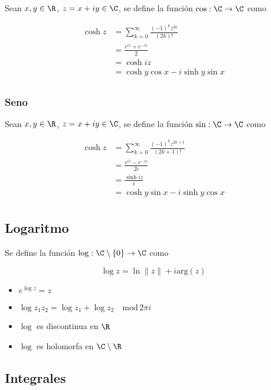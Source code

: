 Sean $x,y\in\R$, $z = x+iy\in\C$, se define la función $\cos: \C \to \C$ como

\begin{equation}
\begin{split}
    \cosh{z} &= \sum^{\infty}_{k=0}\frac{(-1)^{k}z^{2k}}{(2k)!}\\
    &= \frac{e^{iz}+e^{-iz}}{2}\\
    &= \cosh{iz}\\
    &= \cosh{y}\cos{x}-i\sinh{y}\sin{x}\\
\end{split}
\nonumber
\end{equation}

\subsubsection{Seno}

Sean $x,y\in\R$, $z = x+iy\in\C$, se define la función $\sin: \C \to \C$ como

\begin{equation}
\begin{split}
    \cosh{z} &= \sum^{\infty}_{k=0}\frac{(-1)^{k}z^{2k+1}}{(2k+1)!}\\
    &= \frac{e^{iz}-e^{-iz}}{2i}\\
    &= \frac{\sinh{iz}}{i}\\
    &= \cosh{y}\sin{x}-i\sinh{y}\cos{x}\\
\end{split}
\nonumber
\end{equation}

\subsection{Logaritmo}

Se define la función $\log: \C\setminus\{0\}\to\C$ como

\[\log{z} = \ln{\|z\|}+i\mathrm{arg}(z)\]

\begin{itemize}
    \item $e^{\log{z}}= z$
    \item $\log{z_1z_2}=\log{z_1}+\log{z_2}\quad\mathrm{mod}\,2\pi i$
    \item $\log$ es discontinua en $\R$
    \item $\log$ es holomorfa en $\C\setminus\R$
\end{itemize}

\subsection{Integrales}

